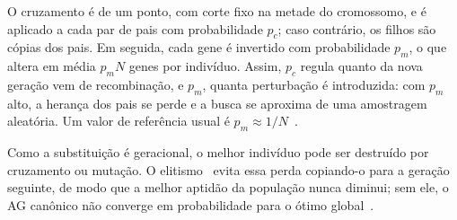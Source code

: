 O cruzamento é de um ponto, com corte fixo na metade do cromossomo, e é aplicado a cada par de pais com probabilidade $p_c$; caso contrário, os filhos são cópias dos pais. Em seguida, cada gene é invertido com probabilidade $p_m$, o que altera em média $p_m N$ genes por indivíduo. Assim, $p_c$ regula quanto da nova geração vem de recombinação, e $p_m$, quanta perturbação é introduzida: com $p_m$ alto, a herança dos pais se perde e a busca se aproxima de uma amostragem aleatória. Um valor de referência usual é $p_m \approx 1/N$~\cite{eiben2015}.

Como a substituição é geracional, o melhor indivíduo pode ser destruído por cruzamento ou mutação. O elitismo~\cite{dejong1975} evita essa perda copiando-o para a geração seguinte, de modo que a melhor aptidão da população nunca diminui; sem ele, o AG canônico não converge em probabilidade para o ótimo global~\cite{rudolph1994}.
